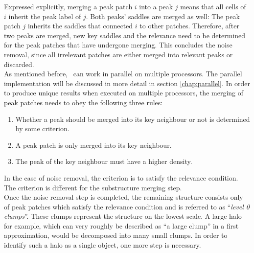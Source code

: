 Expressed explicitly, merging a peak patch $i$ into a peak $j$ means that all cells of $i$ inherit the peak label of $j$.
Both peaks' saddles are merged as well: 
The peak patch $j$ inherits the saddles that connected $i$ to other patches.
Therefore, after two peaks are merged, new key saddles and the relevance need to be determined for the peak patches that have undergone merging.
This concludes the noise removal, since all irrelevant patches are either merged into relevant peaks or discarded.\\
%
As mentioned before, \phew\ can work in parallel on multiple processors.
The parallel implementation will be discussed in more detail in section \ref{chap:parallel}.
In order to produce unique results when executed on multiple processors, the merging of peak patches needs to obey the following three rules:
%
\begin{enumerate}
	\item Whether a peak should be merged into its key neighbour or not is determined by some criterion.
	\item A peak patch is only merged into its key neighbour.
	\item The peak of the key neighbour must have a higher density.
\end{enumerate}
%
In the case of noise removal, the criterion is to satisfy the relevance condition. The criterion is different for the substructure merging step.\\
%
Once the noise removal step is completed, the remaining structure consists only of peak patches which satisfy the relevance condition and is referred to as ``\emph{level 0 clumps}''. 
These clumps represent the structure on the lowest scale.
A large halo for example, which can very roughly be described as ``a large clump'' in a first approximation, would be decomposed into many small clumps. In order to identify such a halo as a single object, one more step is necessary.


